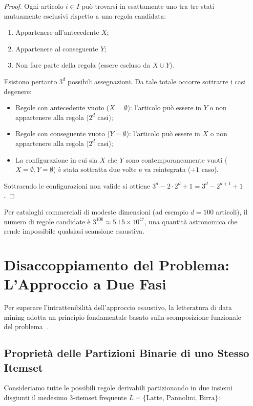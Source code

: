 \begin{proof}
Ogni articolo $i \in I$ può trovarsi in esattamente uno tra tre stati mutuamente esclusivi rispetto a una regola candidata:
\begin{enumerate}[noitemsep]
    \item Appartenere all'antecedente $X$;
    \item Appartenere al conseguente $Y$;
    \item Non fare parte della regola (essere escluso da $X \cup Y$).
\end{enumerate}
Esistono pertanto $3^d$ possibili assegnazioni. Da tale totale occorre sottrarre i casi degenere:
\begin{itemize}[noitemsep]
    \item Regole con antecedente vuoto ($X = \emptyset$): l'articolo può essere in $Y$ o non appartenere alla regola ($2^d$ casi);
    \item Regole con conseguente vuoto ($Y = \emptyset$): l'articolo può essere in $X$ o non appartenere alla regola ($2^d$ casi);
    \item La configurazione in cui sia $X$ che $Y$ sono contemporaneamente vuoti ($X = \emptyset, Y = \emptyset$) è stata sottratta due volte e va reintegrata ($+1$ caso).
\end{itemize}
Sottraendo le configurazioni non valide si ottiene $3^d - 2 \cdot 2^d + 1 = 3^d - 2^{d+1} + 1$.
\end{proof}

Per cataloghi commerciali di modeste dimensioni (ad esempio $d = 100$ articoli), il numero di regole candidate è $3^{100} \approx 5.15 \times 10^{47}$, una quantità astronomica che rende impossibile qualsiasi scansione esaustiva.

\FloatBarrier
\section{Disaccoppiamento del Problema: L'Approccio a Due Fasi}
\label{sec:dm-two-step-approach}

Per superare l'intrattenibilità dell'approccio esaustivo, la letteratura di data mining adotta un principio fondamentale basato sulla scomposizione funzionale del problema~\cite{agrawal1993, agrawal1994, tan2018}.

\FloatBarrier
\subsection{Proprietà delle Partizioni Binarie di uno Stesso Itemset}
Consideriamo tutte le possibili regole derivabili partizionando in due insiemi disgiunti il medesimo $3$-itemset frequente $L = \{\text{Latte, Pannolini, Birra}\}$:

